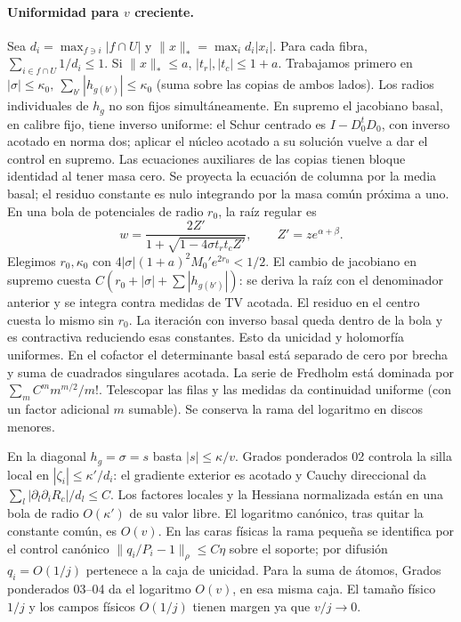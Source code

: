 \paragraph{Uniformidad para $v$ creciente.}
Sea $d_i=\max_{f\ni i}|f\cap U|$ y $\|x\|_*=\max_i d_i|x_i|$. Para cada fibra,
$\sum_{i\in f\cap U}1/d_i\le1$. Si $\|x\|_*\le a$, $|t_r|,|t_c|\le1+a$.
Trabajamos primero en $|\sigma|\le\kappa_0,\ \sum_{b'}|h_{g(b')}|\le\kappa_0$
(suma sobre las copias de ambos lados). Los radios individuales de $h_g$ no son fijos
simultáneamente. En supremo el jacobiano basal, en calibre fijo, tiene inverso uniforme:
el Schur centrado es $I-D_0^tD_0$, con inverso acotado en norma dos; aplicar el núcleo acotado
a su solución vuelve a dar el control en supremo. Las ecuaciones auxiliares de las copias
tienen bloque identidad al tener masa cero. Se proyecta la ecuación de columna por la media
basal; el residuo constante es nulo integrando por la masa común próxima a uno.
En una bola de potenciales de radio $r_0$, la raíz regular es
\[
 w=\frac{2Z'}{1+\sqrt{1-4\sigma t_rt_c Z'}},\qquad Z'=z e^{\alpha+\beta}.
\]
Elegimos $r_0,\kappa_0$ con $4|\sigma|(1+a)^2M_0'e^{2r_0}<1/2$.
El cambio de jacobiano en supremo cuesta $C(r_0+|\sigma|+\sum|h_{g(b')}|)$:
se deriva la raíz con el denominador anterior y se integra contra medidas de TV acotada.
El residuo en el centro cuesta lo mismo sin $r_0$. La iteración con inverso basal queda
dentro de la bola y es contractiva reduciendo esas constantes. Esto da unicidad y holomorfía
uniformes. En el cofactor el determinante basal está separado de cero por brecha y suma de
cuadrados singulares acotada. La serie de Fredholm está dominada por
$\sum_m C^m m^{m/2}/m!$. Telescopar las filas y las medidas da continuidad uniforme
(con un factor adicional $m$ sumable). Se conserva la rama del logaritmo en discos menores.

En la diagonal $h_g=\sigma=s$ basta $|s|\le\kappa/v$. Grados ponderados 02 controla la
silla local en $|\zeta_i|\le\kappa'/d_i$: el gradiente exterior es acotado y Cauchy
direccional da $\sum_l|\partial_l\partial_iR_c|/d_l\le C$. Los factores locales y la
Hessiana normalizada están en una bola de radio $O(\kappa')$ de su valor libre.
El logaritmo canónico, tras quitar la constante común, es $O(v)$. En las caras físicas
la rama pequeña se identifica por el control canónico $\|q_i/P_i-1\|_\rho\le C\eta$
sobre el soporte; por difusión $q_i=O(1/j)$ pertenece a la caja de unicidad.
Para la suma de átomos, Grados ponderados 03--04 da el logaritmo $O(v)$, en esa misma caja.
El tamaño físico $1/j$ y los campos físicos $O(1/j)$ tienen margen ya que $v/j\to0$.

